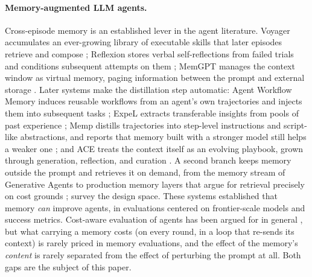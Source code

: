 \documentclass[smallcondensed,natbib]{svjour3}
\begin{document}
\paragraph{Memory-augmented LLM agents.} Cross-episode memory is an
established lever in the agent literature. Voyager accumulates an
ever-growing library of executable skills that later episodes retrieve
and compose \citep{wang2023voyager}; Reflexion stores verbal
self-reflections from failed trials and conditions subsequent attempts
on them \citep{shinn2023reflexion}; MemGPT manages the context window
as virtual memory, paging information between the prompt and external
storage \citep{packer2023memgpt}. Later systems make the distillation
step automatic: Agent Workflow Memory induces reusable workflows from
an agent's own trajectories and injects them into subsequent tasks
\citep{wang2024awm}; ExpeL extracts transferable insights from
pools of past experience \citep{zhao2024expel}; Memp distills
trajectories into step-level instructions and script-like
abstractions, and reports that memory built with a stronger model
still helps a weaker one \citep{fang2026memp}; and ACE treats the
context itself as an evolving playbook, grown through generation,
reflection, and curation \citep{zhang2026ace}. A second branch keeps
memory outside the prompt and retrieves it on demand, from the memory
stream of Generative Agents \citep{park2023generativeagents} to
production memory layers that argue for retrieval precisely on cost
grounds \citep{chhikara2025mem0}; \citet{zhang2025memorysurvey}
survey the design space. These systems established that
memory \emph{can} improve agents, in evaluations centered on
frontier-scale models and success metrics. Cost-aware evaluation of
agents has been argued for in general \citep{kapoor2024agents}, but
what carrying a memory costs (on every round, in a loop that re-sends
its context) is rarely priced in memory evaluations, and the effect of the memory's \emph{content} is
rarely separated from the effect of perturbing the prompt at all. Both
gaps are the subject of this paper.
\end{document}
